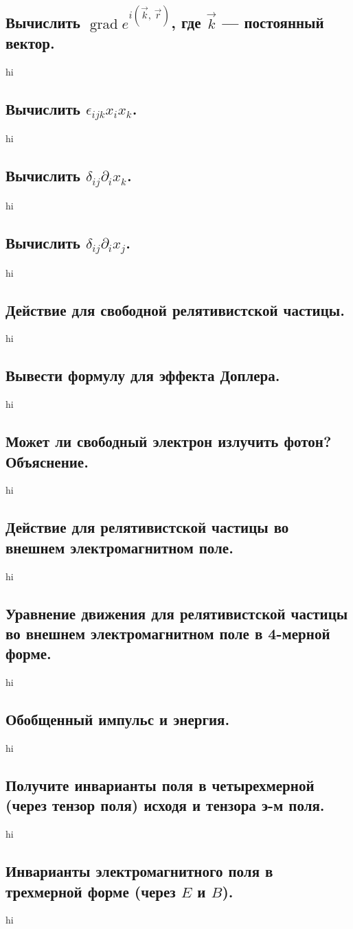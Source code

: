 \documentclass[a4paper,12pt]{article}
\begin{document}
\subsection{Вычислить $\operatorname{grad} e ^{i\left( \vec{k},\,\vec{r}
\right) }$, где $\vec{k}$ --- постоянный вектор.}
hi
\subsection{Вычислить $\epsilon_{ijk}x_i x_k$.}
hi
\subsection{Вычислить $\delta_{ij}\partial_i x_k$.}
hi
\subsection{Вычислить $\delta_{ij}\partial_i x_j$.}
hi
\subsection{Действие для свободной релятивистской частицы.}
hi
\subsection{Вывести формулу для эффекта Доплера.}
hi
\subsection{Может ли свободный электрон излучить фотон? Объяснение.}
hi
\subsection{Действие для релятивистской частицы во внешнем электромагнитном
поле.}
hi
\subsection{Уравнение движения для релятивистской частицы во внешнем
электромагнитном поле в 4-мерной форме.}
hi
\subsection{Обобщенный импульс и энергия.}
hi
\subsection{Получите инварианты поля в четырехмерной (через тензор поля)
исходя и тензора э-м поля.}
hi
\subsection{Инварианты электромагнитного поля в трехмерной форме (через $E$ и
$B$).}
hi
\end{document}
